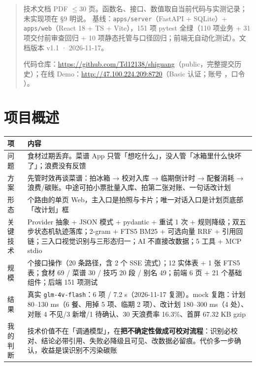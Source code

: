 \begin{quote}
技术文档 PDF \ensuremath{\le}30
页。函数名、接口、数值取自当前代码与实测记录；未实现项在 §9 明说。
基线：\passthrough{\lstinline!apps/server!}（FastAPI + SQLite）+
\passthrough{\lstinline!apps/web!}（React 18 + TS + Vite），151 项
pytest 全绿（110 项业务 + 31 项交付前审查回归 + 10
项静态托管与口径回归；前端无自动化测试）。文档版本 v1.1 · 2026-11-17。

代码仓库：\url{https://github.com/Td12138/shiguang}（public，完整提交历史）；在线
Demo：\url{http://47.100.224.209:8720}（Basic 认证；账号 \texttt{\DemoUser}，口令
\texttt{\DemoPass}）。
\end{quote}

\section{项目概述}\label{ux4e00ux9875ux6458ux8981}

{\def\LTcaptype{none} %
\begin{longtable}[]{@{}
  >{\raggedright\arraybackslash}p{}
  >{\raggedright\arraybackslash}p{}@{}}
\toprule\noalign{}
\begin{minipage}[b]{\linewidth}\raggedright
项
\end{minipage} & \begin{minipage}[b]{\linewidth}\raggedright
内容
\end{minipage} \\
\midrule\noalign{}
\endhead
\bottomrule\noalign{}
\endlastfoot
问题 & 食材过期丢弃。菜谱 App
只管「想吃什么」，没人管「冰箱里什么快坏了」；浪费没有反馈 \\
方案 & 先管时效再谈菜谱：拍冰箱 → 校对入库 → 临期倒计时 → 配餐消耗 →
浪费/碳账。中途可拍小票批量入库、拍第二张对账、一句话改计划 \\
形态 & 6 个路由的单页
Web，主入口是拍照与卡片；唯一对话入口是计划页底部「改计划」框 \\
关键技术 & Provider 抽象 + JSON 模式 + pydantic + 重试 1 次 +
规则降级；双五步状态机轨迹落库；2-gram + FTS5 BM25 + 可选向量 RRF +
引用回链；三入口视觉识别与三形态归一；AI 不直接改数据；5 工具 + MCP
stdio \\
规模 & 22 个接口操作（20 条路径，含 2 个 SSE 流式）；12 实体表 + 1 张
FTS5 表；食材 69 / 菜谱 30 / 技巧 20 段 / 别名 49；前端 6 页 + 21
个基础组件；后端 151 项测试 \\
结果 & 真实 \passthrough{\lstinline!glm-4v-flash!}：6 项 / 7.2 s（2026-11-17 复测）。mock
复跑：计划 80--130 ms（6 餐、用掉 5 项、临期 2 项）、改计划 180--300
ms（4 处）、对账 4 不见/3 新增/1 待确认、30 天浪费率 16.3\%、首屏 67.32
KB gzip \\
我的判断 &
技术价值不在「调通模型」，在\textbf{把不确定性做成可校对流程}：识别必校对、结论必带引用、失败必降级且可见、改数据必留痕。代价多一步确认，收益是误识别不污染碳账 \\
\end{longtable}
}

